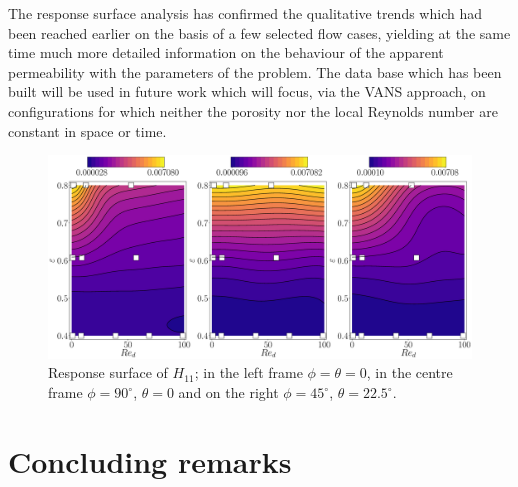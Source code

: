 The response surface analysis has confirmed the qualitative trends which had been reached earlier on the basis of a few selected 
flow cases, yielding at the same time much more detailed information on the behaviour of the apparent permeability with the
parameters of the problem. The data base which has been built will be used in future work which will focus, via the VANS approach,
on configurations for which neither the porosity nor the local Reynolds number are constant in space or time.

\begin{figure}[t]
	\centering
	\includegraphics[width=1\linewidth]{chapter_4/figure/krig_mater_eps_re}
	\caption{Response surface of $H_{11}$; in the left frame $\phi= \theta = 0$, in the centre frame $\phi=90^{\circ}$, $ \theta = 0$ and on the right $\phi= 45^{\circ}$, $ \theta = 22.5^{\circ}$.}
	\label{fig:por}
\end{figure}


\section{Concluding remarks}



